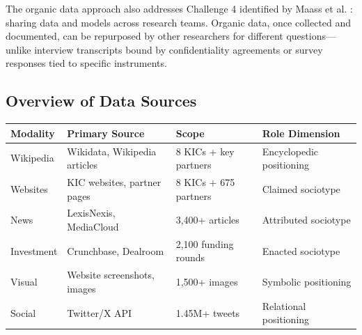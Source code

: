 \documentclass[../main.tex]{subfiles}
\begin{document}
The organic data approach also addresses Challenge 4 identified by Maass et al. \citeyear{maass2018data}: sharing data and models across research teams. Organic data, once collected and documented, can be repurposed by other researchers for different questions---unlike interview transcripts bound by confidentiality agreements or survey responses tied to specific instruments.

\subsection{Overview of Data Sources}

\tableminimal
\begin{center}
\begin{tabular}{@{}p{2cm}p{3.5cm}p{2.5cm}p{2.5cm}@{}}
\toprule
\textbf{Modality} & \textbf{Primary Source} & \textbf{Scope} & \textbf{Role Dimension} \\
\midrule
Wikipedia & Wikidata, Wikipedia articles & 8 KICs + key partners & Encyclopedic positioning \\
Websites & KIC websites, partner pages & 8 KICs + 675 partners & Claimed sociotype \\
News & LexisNexis, MediaCloud & 3,400+ articles & Attributed sociotype \\
Investment & Crunchbase, Dealroom & 2,100 funding rounds & Enacted sociotype \\
Visual & Website screenshots, images & 1,500+ images & Symbolic positioning \\
Social & Twitter/X API & 1.45M+ tweets & Relational positioning \\
\bottomrule
\end{tabular}
\end{center}

\end{document}
